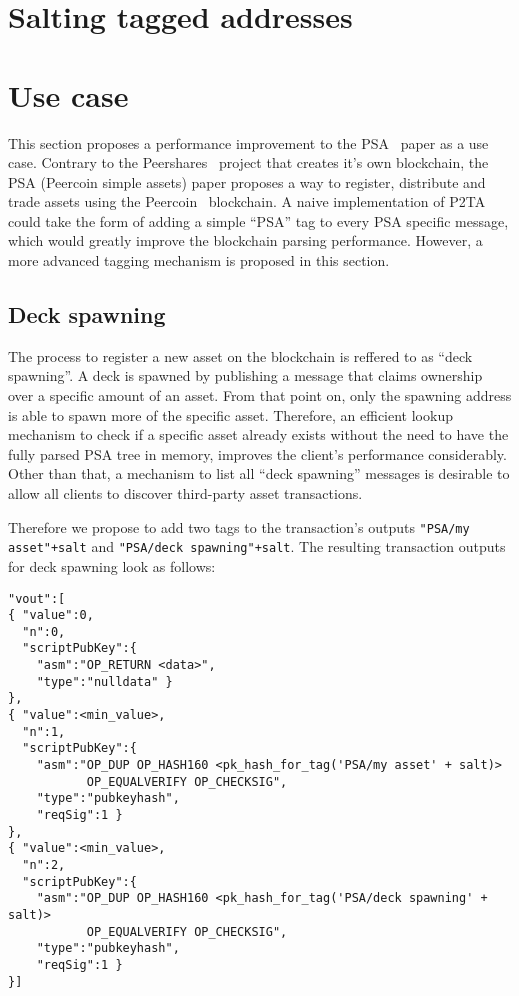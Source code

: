 \documentclass[a4paper,10pt]{article}
\begin{document}
\section{Salting tagged addresses}


\section{Use case}
This section proposes a performance improvement to the PSA~\cite{Pchem} paper as a use case.
Contrary to the Peershares~\cite{TODO} project that creates it's own blockchain, the PSA (Peercoin simple assets) paper proposes a way to register, distribute and trade assets using the Peercoin~\cite{TODO} blockchain.
A naive implementation of P2TA could take the form of adding a simple ``PSA'' tag to every PSA specific message, which would greatly improve the blockchain parsing performance. However, a more advanced tagging mechanism is proposed in this section.

\subsection{Deck spawning}
The process to register a new asset on the blockchain is reffered to as ``deck spawning''. A deck is spawned by publishing a message that claims ownership over a specific amount of an asset. From that point on, only the spawning address is able to spawn more of the specific asset. Therefore, an efficient lookup mechanism to check if a specific asset already exists without the need to have the fully parsed PSA tree in memory, improves the client's performance considerably. Other than that, a mechanism to list all ``deck spawning'' messages is desirable to allow all clients to discover third-party asset transactions.

Therefore we propose to add two tags to the transaction's outputs \verb|"PSA/my asset"+salt| and \verb|"PSA/deck spawning"+salt|.
The resulting transaction outputs for deck spawning look as follows:
\begin{verbatim}
"vout":[
{ "value":0,
  "n":0,
  "scriptPubKey":{
    "asm":"OP_RETURN <data>",
    "type":"nulldata" }
},
{ "value":<min_value>,
  "n":1,
  "scriptPubKey":{
    "asm":"OP_DUP OP_HASH160 <pk_hash_for_tag('PSA/my asset' + salt)>
           OP_EQUALVERIFY OP_CHECKSIG",
    "type":"pubkeyhash",
    "reqSig":1 }
},
{ "value":<min_value>,
  "n":2,
  "scriptPubKey":{
    "asm":"OP_DUP OP_HASH160 <pk_hash_for_tag('PSA/deck spawning' + salt)>
           OP_EQUALVERIFY OP_CHECKSIG",
    "type":"pubkeyhash",
    "reqSig":1 }
}]
\end{verbatim}
\end{document}
